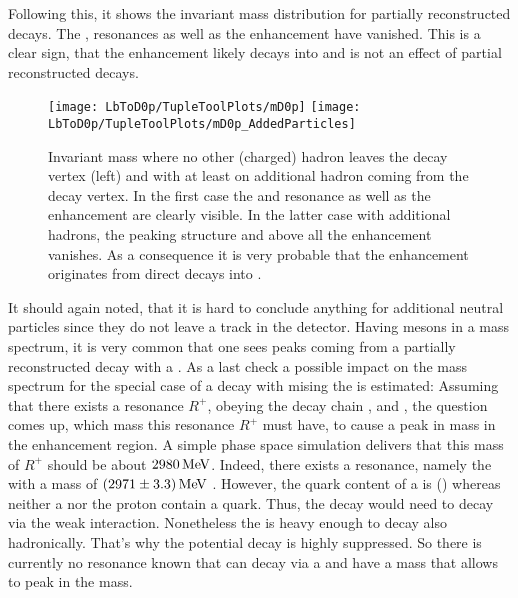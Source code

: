 Following this, it shows the invariant \Dz\proton mass distribution for partially reconstructed decays.
The \LcResI, \LcResII resonances as well as the enhancement have vanished.
This is a clear sign, that the enhancement likely decays into \Dz\proton and is not an effect of partial reconstructed decays.
\begin{figure}[hptb]
	\centering
	\texttt{[image: LbToD0p/TupleToolPlots/mD0p]}
	\texttt{[image: LbToD0p/TupleToolPlots/mD0p\_AddedParticles]}
	\caption{Invariant \Dz\proton mass where no other (charged) hadron leaves the \Dz\proton\mun decay vertex (left) and with at least on additional hadron coming from the \Dz\proton\mun decay vertex.
             In the first case the \LcResI and \LcResII resonance as well as the enhancement are clearly visible.
             In the latter case with additional hadrons, the peaking structure and above all the enhancement vanishes. 
             As a consequence it is very probable that the enhancement originates from direct decays into \Dz\proton.
    }
	\label{fig:mD0p_AdditionalParticles}
\end{figure}

It should again noted, that it is hard to conclude anything for additional neutral particles since they do not leave a track in the detector.
Having \D mesons in a mass spectrum, it is very common that one sees peaks coming from a partially reconstructed decay with a \decay{\Dstar}{\D\pion}.
As a last check a possible impact on the \Dz\proton mass spectrum for the special case of a \decay{\Dstarz}{\Dz\piz} decay with mising the \piz is estimated:
Assuming that there exists a resonance $R^{+}$, obeying the decay chain ,  and \decay{\Dstarz}{\Dz\piz}, the question comes up, which mass this resonance $R^{+}$ must have, to cause a peak in \Dz\proton mass in the enhancement region.
A simple phase space simulation delivers that this mass of $R^{+}$ should be about $2980\mathrm{\,Me\kern -0.1em V}$.
Indeed, there exists a resonance, namely the  with a mass of $(2971 \pm 3.3)\mathrm{\,Me\kern -0.1em V}$ \cite{PDG}.
However, the quark content of a \Xicp is (\uquark\cquark\squark) whereas neither a \Dstarz nor the proton contain a \squark quark.
Thus, the decay  would need to decay via the weak interaction.
Nonetheless the  is heavy enough to decay also hadronically. 
That's why the potential decay  is highly suppressed.
So there is currently no resonance known that can decay via a \Dstarz\proton and have a mass that allows to peak in the \Dz\proton mass.

